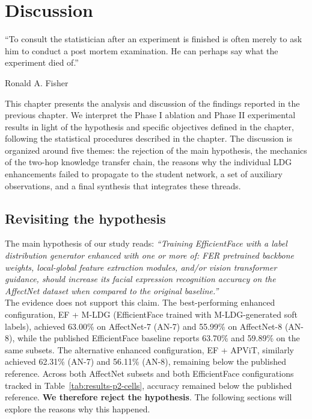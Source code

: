 
\chapter{Discussion}
\epigraph{``To consult the statistician after an experiment is finished is often merely to ask him to conduct a post mortem examination. He can perhaps say what the experiment died of.''}{\vspace{10pt}Ronald A. Fisher}
\label{chapter:discussion}

\newpage

This chapter presents the analysis and discussion of the findings reported in the previous chapter. We interpret the Phase I ablation and Phase II experimental results in light of the hypothesis and specific objectives defined in the  chapter, following the statistical procedures described in the  chapter. The discussion is organized around five themes: the rejection of the main hypothesis, the mechanics of the two-hop knowledge transfer chain, the reasons why the individual LDG enhancements failed to propagate to the student network, a set of auxiliary observations, and a final synthesis that integrates these threads.

\section{Revisiting the hypothesis}
\label{section:discussion-hypothesis}

The main hypothesis of our study reads: \textit{``Training EfficientFace with a label distribution generator enhanced with one or more of: FER pretrained backbone weights, local-global feature extraction modules, and/or vision transformer guidance, should increase its facial expression recognition accuracy on the AffectNet dataset when compared to the original baseline.''}\\

The evidence does not support this claim. The best-performing enhanced configuration, EF + M-LDG (EfficientFace trained with M-LDG-generated soft labels), achieved 63.00\% on AffectNet-7 (AN-7) and 55.99\% on AffectNet-8 (AN-8), while the published EfficientFace baseline \cite{eff-face2021} reports 63.70\% and 59.89\% on the same subsets. The alternative enhanced configuration, EF + APViT, similarly achieved 62.31\% (AN-7) and 56.11\% (AN-8), remaining below the published reference. Across both AffectNet subsets and both EfficientFace configurations tracked in Table~\ref{tab:results-p2-cells}, accuracy remained below the published reference. \textbf{We therefore reject the hypothesis}. The following sections will explore the reasons why this happened.

